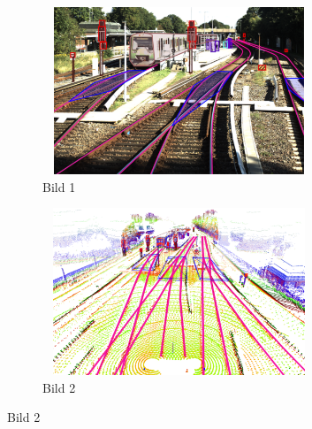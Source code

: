 \begin{figure}[H]
    \centering
    \begin{subfigure}{0.45\textwidth}
        \centering
        \includegraphics[width=0.9\textwidth,height=5cm]{PICs/OSDaR23_dataset/labeled_image.png}
        \caption{Bild 1}
    \end{subfigure}%
    \hspace{0.05\textwidth}
    \begin{subfigure}{0.45\textwidth}
        \centering
        \includegraphics[width=0.9\textwidth,height=5cm]{PICs/OSDaR23_dataset/labeled_3D.png}
        \caption{Bild 2}
    \end{subfigure}

    \vspace{0.5cm} %


\end{figure}

